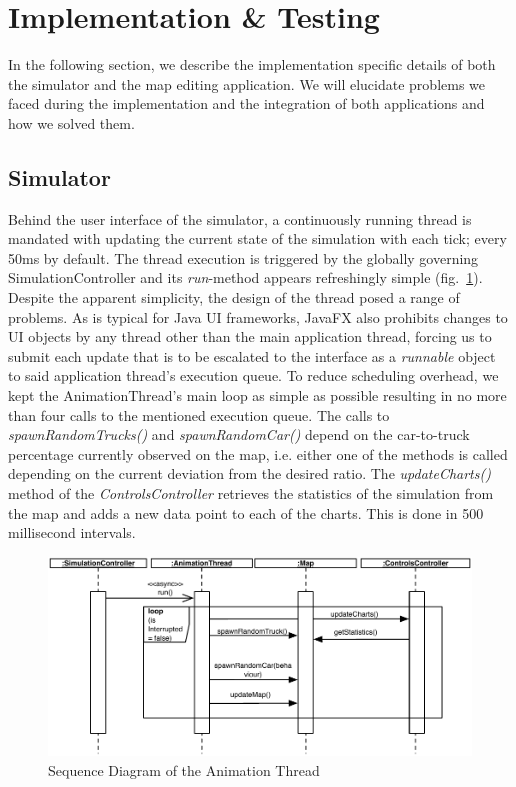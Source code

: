 \section{Implementation \& Testing}
In the following section, we describe the implementation specific details of both the simulator and the map editing application. We will elucidate problems we faced during the implementation and the integration of both applications and how we solved them. 
\subsection{Simulator}
Behind the user interface of the simulator, a continuously running thread is mandated with updating the current state of the simulation with each tick; every 50ms by default. The thread execution is triggered by the globally governing SimulationController and its \textit{run}-method appears refreshingly simple (fig.~\ref{fig:animthread}). Despite the apparent simplicity, the design of the thread posed a range of problems. As is typical for Java UI frameworks, JavaFX also prohibits changes to UI objects by any thread other than the main application thread, forcing us to submit each update that is to be escalated to the interface as a \textit{runnable} object to said application thread's execution queue. To reduce scheduling overhead, we kept the AnimationThread's main loop as simple as possible resulting in no more than four calls to the mentioned execution queue. The calls to \textit{spawnRandomTrucks()} and \textit{spawnRandomCar()} depend on the car-to-truck percentage currently observed on the map, i.e. either one of the methods is called depending on the current deviation from the desired ratio. The \textit{updateCharts()} method of the \textit{ControlsController} retrieves the statistics of the simulation from the map and adds a new data point to each of the charts. This is done in 500 millisecond intervals.

\begin{figure}[h]
	\begin{center}
		\includegraphics[width=\textwidth]{img/SD_animThread.pdf}
		\caption[Sequence Diagram of the Animation Thread]{Sequence Diagram of the Animation Thread}
		\label{fig:animthread}
	\end{center}

\end{figure}

